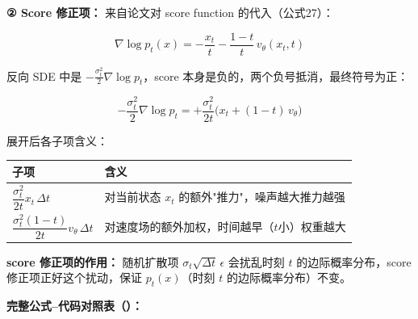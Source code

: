\textbf{② Score 修正项：} 来自论文对 score function 的代入（公式27）：

\[
\nabla \log p_t(x) = -\frac{x_t}{t} - \frac{1-t}{t}\,v_\theta(x_t,t)
\]

反向 SDE 中是 $-\frac{\sigma_t^2}{2}\nabla\log p_t$，score 本身是负的，两个负号抵消，最终符号为正：

\[
-\frac{\sigma_t^2}{2}\nabla\log p_t = +\frac{\sigma_t^2}{2t}\bigl(x_t + (1-t)\,v_\theta\bigr)
\]

展开后各子项含义：

\begin{center}
\begin{tabular}{ll}
\hline
子项 & 含义 \\
\hline
$\dfrac{\sigma_t^2}{2t}x_t\,\Delta t$ & 对当前状态 $x_t$ 的额外"推力"，噪声越大推力越强 \\[6pt]
$\dfrac{\sigma_t^2(1-t)}{2t}v_\theta\,\Delta t$ & 对速度场的额外加权，时间越早（$t$小）权重越大 \\
\hline
\end{tabular}
\end{center}

\begin{intubox}
\textbf{score 修正项的作用：} 随机扩散项 $\sigma_t\sqrt{\Delta t}\,\epsilon$ 会扰乱时刻 $t$ 的边际概率分布，score 修正项正好这个扰动，保证 $p_t(x)$（时刻 $t$ 的边际概率分布）不变。
\end{intubox}

\textbf{完整公式–代码对照表（）：}

